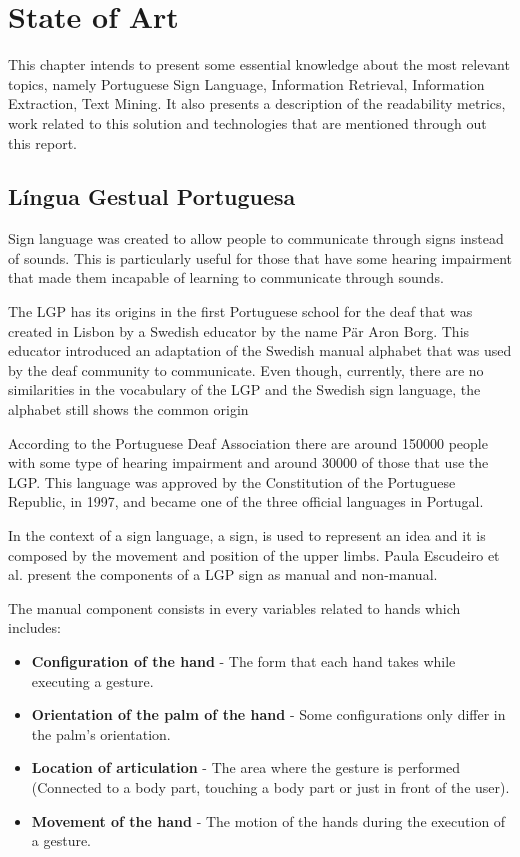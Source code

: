 
\chapter{State of Art}
\label{chap:Chapter2}

This chapter intends to present some essential knowledge about the most relevant topics, namely Portuguese Sign Language, Information Retrieval, Information Extraction, Text Mining.
It also presents a description of the readability metrics, work related to this solution and technologies that are mentioned through out this report.

\section{Língua Gestual Portuguesa}

Sign language was created to allow people to communicate through signs instead of sounds.
This is particularly useful for those that have some hearing impairment that made them incapable of learning to communicate through sounds.

The \gls{LGP} has its origins in the first Portuguese school for the deaf that was created in Lisbon by a Swedish educator by the name Pär Aron Borg.
This educator introduced an adaptation of the Swedish manual alphabet that was used by the deaf community to communicate.
Even though, currently, there are no similarities in the vocabulary of the \gls{LGP} and the Swedish sign language, the alphabet still shows the common origin\cite{oliveira2013tradutor}\cite{escudeiro2015virtual}

According to the Portuguese Deaf Association there are around 150000 people with some type of hearing impairment and around 30000 of those that use the \gls{LGP}\cite{gaspar2015if2lgp}.
This language was approved by the Constitution of the Portuguese Republic, in 1997, and became one of the three official languages in Portugal.

In the context of a sign language, a sign, is used to represent an idea and it is composed by the movement and position of the upper limbs.
Paula Escudeiro et al.\cite{escudeiro2015virtual} present the components of a \gls{LGP} sign as manual and non-manual.

The manual component consists in every variables related to hands which includes:
\begin{itemize}
    \item \textbf{Configuration of the hand} - The form that each hand takes while executing a gesture.
    \item \textbf{Orientation of the palm of the hand} - Some configurations only differ in the palm's orientation.
    \item \textbf{Location of articulation} - The area where the gesture is performed (Connected to a body part, touching a body part or just in front of the user).
    \item \textbf{Movement of the hand} - The motion of the hands during the execution of a gesture.
\end{itemize}

